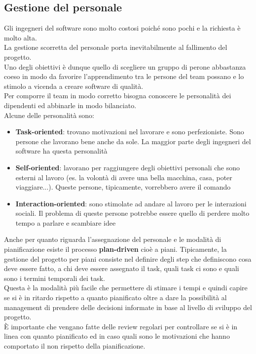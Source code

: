 \subsection{Gestione del personale}
Gli ingegneri del software sono molto costosi poiché sono pochi e la richiesta è molto alta.\\
La gestione scorretta del personale porta inevitabilmente al fallimento del progetto.\\
Uno degli obiettivi è dunque quello di scegliere un gruppo di perone abbastanza coeso in modo da favorire l'apprendimento tra le persone del team possano e lo stimolo a vicenda a creare software di qualità.\\
Per comporre il team in modo corretto bisogna conoscere le personalità dei dipendenti ed abbinarle in modo bilanciato.\\
Alcune delle personalità sono:
\begin{itemize}[noitemsep]
    \item \textbf{Task-oriented}: trovano motivazioni nel lavorare e sono perfezioniste. Sono persone che lavorano bene anche da sole. La maggior parte degli ingegneri del software ha questa personalità
    \item \textbf{Self-oriented}: lavorano per raggiungere degli obiettivi personali che sono esterni al lavoro (es. la volontà di avere una bella macchina, casa, poter viaggiare...). Queste persone, tipicamente, vorrebbero avere il comando
    \item \textbf{Interaction-oriented}: sono stimolate ad andare al lavoro per le interazioni sociali. Il problema di queste persone potrebbe essere quello di perdere molto tempo a parlare e scambiare idee
\end{itemize}
Anche per quanto riguarda l'assegnazione del personale e le modalità di pianificazione esiste il processo \textbf{plan-driven} cioè a piani.
Tipicamente, la gestione del progetto per piani consiste nel definire degli step che definiscono cosa deve essere fatto, a chi deve essere assegnato il task, quali task ci sono e quali sono i termini temporali dei task.\\
Questa è la modalità più facile che permettere di stimare i tempi e quindi capire se si è in ritardo rispetto a quanto pianificato oltre a dare la possibilità al management di prendere delle decisioni informate in base al livello di sviluppo del progetto.\\
È importante che vengano fatte delle review regolari per controllare se si è in linea con quanto pianificato ed in caso quali sono le motivazioni che hanno comportato il non rispetto della pianificazione.\\
